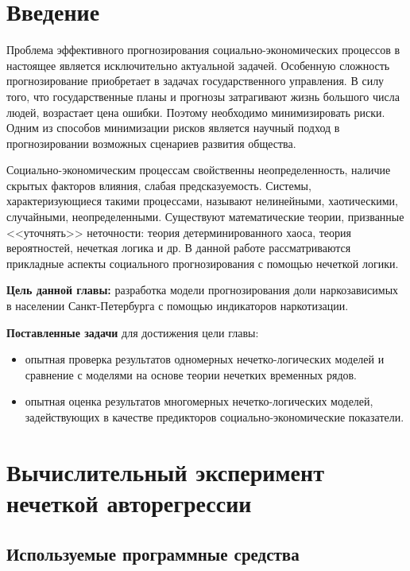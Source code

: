 \section*{Введение}

Проблема эффективного прогнозирования социально-экономических процессов в настоящее является исключительно актуальной задачей. Особенную сложность прогнозирование приобретает в задачах государственного управления. В силу того, что государственные планы и прогнозы затрагивают жизнь большого числа людей, возрастает цена ошибки. Поэтому необходимо минимизировать риски. Одним из способов минимизации рисков является научный подход в прогнозировании возможных сценариев развития общества.  

Социально-экономическим процессам свойственны неопределенность, наличие скрытых факторов влияния, слабая предсказуемость. Системы, характеризующиеся такими процессами, называют нелинейными, хаотическими, случайными, неопределенными. Существуют математические теории, призванные <<уточнять>> неточности: теория детерминированного хаоса, теория вероятностей, нечеткая логика и др. В данной работе рассматриваются прикладные аспекты социального прогнозирования с помощью нечеткой логики.

\textbf{Цель данной главы:} разработка модели прогнозирования доли
наркозависимых в населении Санкт-Петербурга с помощью индикаторов
наркотизации.%

\textbf{Поставленные задачи} для достижения цели главы:
\begin{itemize}
    \item опытная проверка результатов одномерных нечетко-логических моделей и
        сравнение с	моделями на основе теории нечетких временных рядов.
    \item опытная оценка результатов многомерных нечетко-логических моделей, 
        задействующих в качестве предикторов социально-экономические показатели.
\end{itemize} 

\section{Вычислительный эксперимент нечеткой авторегрессии}

\subsection{Используемые программные средства}

